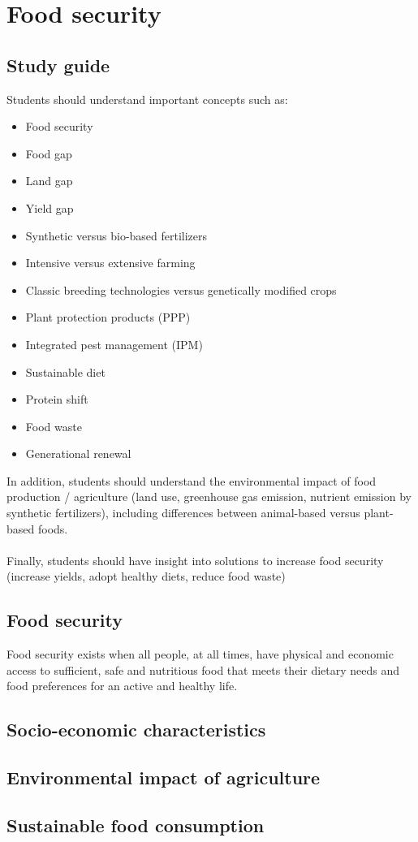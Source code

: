 \documentclass[../summary.tex]{subfiles}
\begin{document}
	
	\section{Food security}
	
	\subsection{Study guide}
	
	Students should understand important concepts such as:
	\begin{itemize} 
	\item Food security
	\item Food gap
	\item Land gap
	\item Yield gap
	\item Synthetic versus bio-based fertilizers
	\item Intensive versus extensive farming
	\item Classic breeding technologies versus genetically modified crops
	\item Plant protection products (PPP)
	\item Integrated pest management (IPM)
	\item Sustainable diet
	\item Protein shift
	\item Food waste
	\item Generational renewal
	\end{itemize}
	In addition, students should understand the environmental impact of food production / agriculture (land use, greenhouse gas emission, nutrient emission by synthetic fertilizers), including differences between animal-based versus plant-based foods.
	\\\\
	Finally, students should have insight into solutions to increase food security (increase yields, adopt healthy
	diets, reduce food waste)
	
	\subsection{Food security}
	
	Food security exists when all people, at all times, have physical and economic access to sufficient, safe and nutritious food that meets their dietary needs and food preferences for an active and healthy life. 
	
	
	\subsection{Socio-economic characteristics}
	
	
	
	\subsection{Environmental impact of agriculture}
	
	\subsection{Sustainable food consumption}
	
\end{document}
